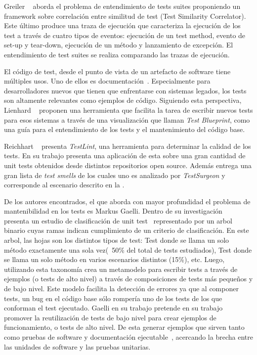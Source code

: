 \par Greiler \etal~\cite{Grei12a,greiler2012test} aborda el problema de entendimiento de tests suites proponiendo un framework sobre correlación entre similitud de test (Test Similarity Correlator). Este último produce una traza de ejecución que caracteriza la ejecución de los test a través de cuatro tipos de eventos: ejecución de un test method, evento de set-up y tear-down, ejecución de un método y lanzamiento de excepción. El entendimiento de test suites se realiza comparando las trazas de ejecución.

\par El código de test, desde el punto de vista de un artefacto de software tiene múltiples usos. Uno de ellos es documentación~\cite{Kuhn08a}. Especialmente para desarrolladores nuevos que tienen que enfrentarse con sistemas legados, los tests son altamente relevantes como ejemplos de código. Siguiendo esta perspectiva, Lienhard \etal~\cite{Lien08a} proponen una herramienta que facilita la tarea de escribir nuevos tests para esos sistemas a través de una visualización que llaman \emph{Test Blueprint}, como una guía para el entendimiento de los tests y el mantenimiento del código base.  

\par Reichhart \etal~\cite{reichhart2007rule} presenta \emph{TestLint}, una herramienta para determinar la calidad de los tests. En su trabajo presenta una aplicación de esta sobre una gran cantidad de unit tests obtenidos desde distintos repositorios open source. Además entrega una gran lista de \emph{test smells} de los cuales uno es analizado por \emph{TestSurgeon} y corresponde al escenario descrito en la .

\par De los autores encontrados, el que aborda con mayor profundidad el problema de mantenibilidad en los tests es Markus Gaelli. Dentro de su investigación~\cite{gaelli2006composing,gaelli2007composing} presenta un estudio de clasificación de unit test~\cite{gaelli2005towards} representado por un arbol binario cuyas ramas indican cumplimiento de un criterio de clasificación. En este arbol, las hojas son los distintos tipos de test: Test donde se llama un solo método exactamente una sola vez(~50\% del total de tests estudiados), Test donde se llama un solo método en varios escenarios distintos (15\%), etc. Luego, utilizando esta taxonomía crea un metamodelo para escribir tests a través de ejemplos (o tests de alto nivel) a través de composiciones de tests más pequeños y de bajo nivel. Este modelo facilita la detección de errores ya que al componer tests, un bug en el código base sólo rompería uno de los tests de los que conforman el test ejecutado. Gaelli en su trabajo pretende en su trabajo promover la reutilización de tests de bajo nivel para crear ejemplos de funcionamiento, o tests de alto nivel. De esta generar ejemplos que sirven tanto como pruebas de software y documentación ejecutable~\cite{gaelli2006modeling}, acercando la brecha entre las unidades de software y las pruebas unitarias.

